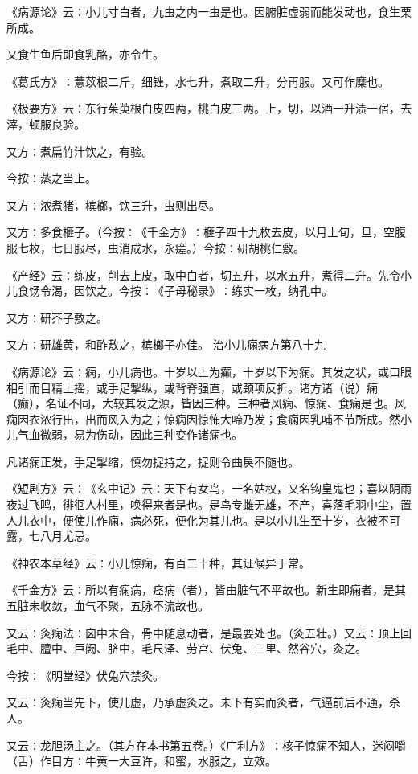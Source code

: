 \documentclass[a4paper,12pt,UTF8,twoside]{ctexbook}
\begin{document}
《病源论》云∶小儿寸白者，九虫之内一虫是也。因腑脏虚弱而能发动也，食生栗所成。

又食生鱼后即食乳酪，亦令生。

《葛氏方》∶薏苡根二斤，细锉，水七升，煮取二升，分再服。又可作糜也。

《极要方》云∶东行茱萸根白皮四两，桃白皮三两。上，切，以酒一升渍一宿，去滓，顿服良验。

又方∶煮扁竹汁饮之，有验。

今按∶蒸之当上。

又方∶浓煮猪，槟榔，饮三升，虫则出尽。

又方∶多食榧子。（今按∶《千金方》∶榧子四十九枚去皮，以月上旬，旦，空腹服七枚，七日服尽，虫消成水，永瘥。）今按∶研胡桃仁敷。

《产经》云∶练皮，削去上皮，取中白者，切五升，以水五升，煮得二升。先令小儿食饧令渴，因饮之。今按∶《子母秘录》∶练实一枚，纳孔中。

又方∶研芥子敷之。

又方∶研雄黄，和酢敷之，槟榔子亦佳。
治小儿痫病方第八十九

《病源论》云∶痫，小儿病也。十岁以上为癫，十岁以下为痫。其发之状，或口眼相引而目精上摇，或手足掣纵，或背脊强直，或颈项反折。诸方诸（说）痫（癫），名证不同，大较其发之源，皆因三种。三种者风痫、惊痫、食痫是也。风痫因衣浓行出，出而风入为之；惊痫因惊怖大啼乃发；食痫因乳哺不节所成。然小儿气血微弱，易为伤动，因此三种变作诸痫也。

凡诸痫正发，手足掣缩，慎勿捉持之，捉则令曲戾不随也。

《短剧方》云∶《玄中记》云∶天下有女鸟，一名姑权，又名钩皇鬼也；喜以阴雨夜过飞鸣，徘徊人村里，唤得来者是也。是鸟专雌无雄，不产，喜落毛羽中尘，置人儿衣中，便使儿作痫，病必死，便化为其儿也。是以小儿生至十岁，衣被不可露，七八月尤忌。

《神农本草经》云∶小儿惊痫，有百二十种，其证候异于常。

《千金方》云∶所以有痫病，痉病（者），皆由脏气不平故也。新生即痫者，是其五脏未收敛，血气不聚，五脉不流故也。

又云∶灸痫法∶囟中末合，骨中随息动者，是最要处也。（灸五壮。）又云∶顶上回毛中、膻中、巨阙、脐中，毛尺泽、劳宫、伏兔、三里、然谷穴，灸之。

今按∶《明堂经》伏兔穴禁灸。

又云∶灸痫当先下，使儿虚，乃承虚灸之。未下有实而灸者，气逼前后不通，杀人。

又云∶龙胆汤主之。（其方在本书第五卷。）《广利方》∶核子惊痫不知人，迷闷嚼（舌）作目方∶牛黄一大豆许，和蜜，水服之，立效。
\end{document}
